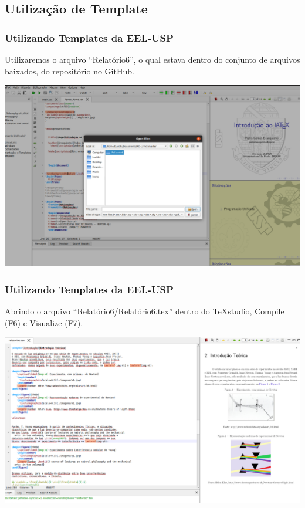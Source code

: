 \documentclass{beamer}
\begin{document}
\begin{frame}
  \section{Utilização de Template}
  \frametitle{Utilizando Templates da EEL-USP}
  Utilizaremos o arquivo ``Relatório6'', o qual estava dentro do
  conjunto de arquivos baixados, do repositório no GitHub.

  \begin{center}
    \includegraphics[scale=0.20]{../Imagens/ST1.png}
  \end{center}
\end{frame}



\begin{frame}

  \frametitle{Utilizando Templates da EEL-USP}

Abrindo o arquivo ``Relatório6/Relatório6.tex'' dentro do TeXstudio,
Compile (F6) e Visualize (F7).

\begin{center}
  \includegraphics[scale=0.20] {../Imagens/ST3.png}
  \end{center}


\end{frame}
\end{document}
